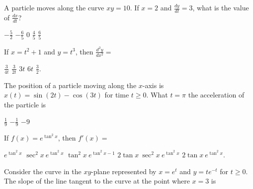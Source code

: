 \begin{questions}
\question[2] A particle moves along the curve $xy = 10$. If $x = 2$
    and $\frac{dy}{dt} = 3$, what is the value of $\frac{dx}{dt}$?
    
    \begin{oneparchoices}
    \choice $-\frac{5}{2}$
    \CorrectChoice $-\frac{6}{5}$
    \choice $0$
    \choice $\frac{4}{5}$
    \choice $\frac{6}{5}$
    \end{oneparchoices}


\question[2] If $x = t^2 + 1$ and $y = t^3$, then $\frac{d^2y}{dx^2} = $

    \begin{oneparchoices}
    \CorrectChoice $\frac{3}{4t}$
    \choice $\frac{3}{2t}$
    \choice $3t$
    \choice $6t$
    \choice $\frac{3}{2}$.
    \end{oneparchoices}


\question[2] The position of a particle moving along the $x$-axis is
    $x(t) = \sin(2t) - \cos(3t)$ for time $t \ge 0$. What $t = \pi$
    the acceleration of the particle is

    \begin{oneparchoices}
    \choice $\frac{1}{9}$
    \choice $-\frac{1}{9}$
    \CorrectChoice $-9$
    \end{oneparchoices}

\question[2] If $f(x) = e^{\tan^2 x}$, then $f'(x) = $

    \begin{oneparchoices}
    \choice $e^{\tan^2 x}$
    \choice $\sec^2 x\ e^{\tan^2 x}$
    \choice $\tan^2 x\ e^{\tan^2 x - 1}$
    \CorrectChoice $2\tan x\ \sec^2 x\ e^{\tan^2 x}$
    \choice $2\tan x\ e^{\tan^2 x}$.
    \end{oneparchoices}

\question[2] Consider the curve in the $xy$-plane represented by $x =
    e^t$ and $y = te^{-t}$ for $t \ge 0$. The slope of the line
    tangent to the curve at the point where $x = 3$ is

    \begin{oneparchoices}
    \end{oneparchoices}


\end{questions}
